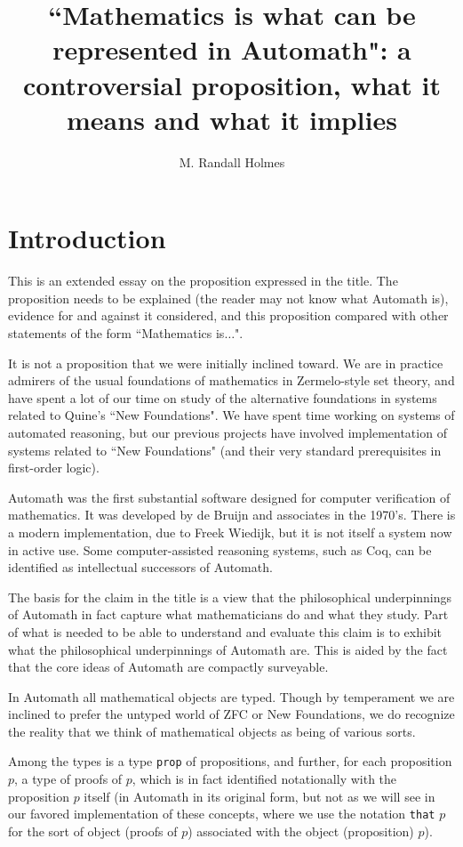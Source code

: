 \documentclass[12pt]{article}
\title{``Mathematics is what can be represented in Automath":  a controversial proposition, what it means  and what it implies}
\author{M. Randall Holmes}
\begin{document}
\maketitle

\section{Introduction}

This is an extended essay on the proposition expressed in the title.  The proposition needs to be explained (the reader may not know what Automath is), evidence for and against it considered, and this proposition compared with other statements of the form ``Mathematics is$\ldots$".

It is not a proposition that we were initially inclined toward.  We are in practice admirers of the usual foundations of mathematics in Zermelo-style set theory, and have spent a lot of our time on study of the alternative foundations in systems related to Quine's ``New Foundations".  We have spent time working on systems of automated reasoning, but our previous projects have involved implementation of systems related to ``New Foundations" (and their very standard prerequisites in first-order logic).

Automath was the first substantial software designed for computer verification of mathematics.   It was developed by de Bruijn and associates in the 1970's.  There is a modern implementation, due to Freek Wiedijk, but it is not itself a system now in active use.  Some computer-assisted reasoning systems, such as Coq, can be identified as intellectual successors of Automath.

The basis for the claim in the title is a view that the philosophical underpinnings of Automath in fact capture what mathematicians do and what they study.  Part of what is needed to be able to understand and evaluate this claim is to exhibit what the philosophical underpinnings of Automath are.  This is aided by the fact that the core ideas of Automath are compactly surveyable.

In Automath all mathematical objects are typed.  Though by temperament we are inclined to prefer the untyped world of ZFC or New Foundations, we do recognize the reality that we think of mathematical objects as being of various sorts.

Among the types is a type {\tt prop} of propositions, and further, for each proposition $p$, a type of proofs of $p$, which is in fact identified notationally with the proposition $p$ itself (in Automath in its original form, but not as we will see in our favored implementation of these concepts, where we use the notation {\tt that} $p$ for the sort of object (proofs of $p$) associated with the object (proposition) $p$).
\end{document}
